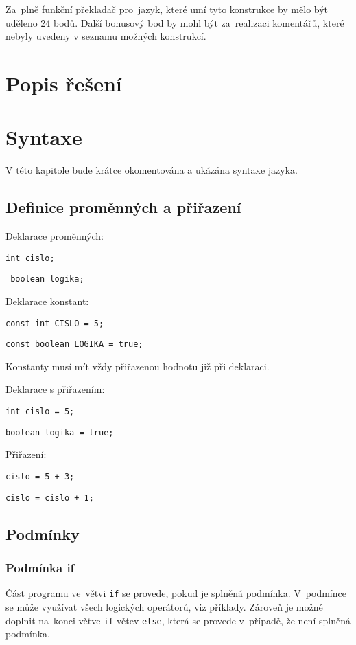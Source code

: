 \documentclass[czech]{thesiskiv}
\begin{document}
\noindent Za~plně funkční překladač pro~jazyk, které umí tyto konstrukce by mělo být uděleno 24 bodů.
Další bonusový bod by mohl být za~realizaci komentářů, které nebyly uvedeny v seznamu možných konstrukcí.

\chapter{Popis řešení}

\chapter{Syntaxe}
V této kapitole bude krátce okomentována a ukázána syntaxe jazyka.

\section{Definice proměnných a přiřazení}

Deklarace proměnných:

\texttt{int cislo;}

\texttt{
boolean logika;}

\noindent Deklarace konstant:

\texttt{const int CISLO = 5;}

\texttt{const boolean LOGIKA = true;}

\noindent Konstanty musí mít vždy přiřazenou hodnotu již při deklaraci.

\noindent Deklarace s přiřazením: 

\texttt{int cislo = 5;}

\texttt{boolean logika = true;}

\noindent Přiřazení:

\texttt{cislo = 5 + 3;}

\texttt{cislo = cislo + 1;}

\section{Podmínky}
\subsection{Podmínka if}
Část programu ve~větvi \texttt{if} se provede, pokud je splněná podmínka.
V~podmínce se může využívat všech logických operátorů, viz příklady.
Zároveň je možné doplnit na~konci větve \texttt{if} větev \texttt{else}, která 
se provede v~případě, že není splněná podmínka.
\end{document}
